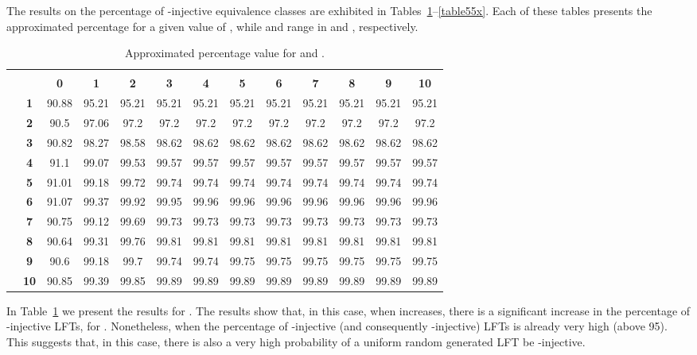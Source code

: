 \documentclass{ocg}
\newcommand{\LFT}{LFT}
\begin{document}
The results on the percentage of -injective equivalence classes
are exhibited in Tables~\ref{table25x}--\ref{table55x}. Each of these
tables presents the approximated percentage for a given value of , while  and  range in  and
, respectively.

\begin{table}[h]
  \centering\scriptsize
  \begin{tabular}{|c|c|c|c|c|c|c|c|c|c|c|c|c|}\cline{3-13}
    \multicolumn{1}{c}{}&\multicolumn{1}{c}{} & \multicolumn{11}{|c|}{\footnotesize } \\
    \cline{3-13} 
    \multicolumn{2}{c|}{}&\bf 0&\bf1&\bf2&\bf3&\bf4&\bf5&\bf6&\bf7&\bf8&\bf9&\bf10\\\hline
    \multirow{10}{*}{\footnotesize }& \bf 1
    &90.88&95.21&95.21&95.21&95.21&95.21&95.21&95.21&95.21&95.21&95.21\\
    \cline{2-13}
    &\bf 2& 90.5&97.06&97.2&97.2&97.2&97.2&97.2&97.2&97.2&97.2& 97.2\\
    \cline{2-13}
    &\bf 3&90.82&98.27&98.58&98.62&98.62&98.62&98.62&98.62&98.62&98.62&98.62\\
    \cline{2-13}
    &\bf 4&91.1&99.07&99.53&99.57&99.57&99.57&99.57&99.57&99.57&99.57&99.57\\
    \cline{2-13}
    &\bf 5&91.01&99.18&99.72&99.74&99.74&99.74&99.74&99.74&99.74&99.74&99.74\\
    \cline{2-13}
    &\bf 6&91.07&99.37&99.92&99.95&99.96&99.96&99.96&99.96&99.96&99.96&99.96\\
    \cline{2-13}
    &\bf 7&90.75&99.12&99.69&99.73&99.73&99.73&99.73&99.73&99.73&99.73&99.73\\
    \cline{2-13}
    &\bf 8&90.64&99.31&99.76&99.81&99.81&99.81&99.81&99.81&99.81&99.81&99.81\\
    \cline{2-13}
    &\bf 9&90.6&99.18&99.7&99.74&99.74&99.75&99.75&99.75&99.75&99.75&99.75\\
    \cline{2-13}
    &\bf 10&90.85&99.39&99.85&99.89&99.89&99.89&99.89&99.89&99.89&99.89&99.89\\
    \hline
  \end{tabular}
  \caption{Approximated percentage value for  and .}
  \label{table25x}
\end{table}

In Table~\ref{table25x} we present the results for . The results show
that, in this case, when  increases, there is a significant
increase in the percentage of -injective \LFT{}s, for . Nonetheless, when  the percentage of -injective (and
consequently -injective) \LFT{}s is already very high (above
95). This suggests that, in this case, there is also a very high
probability of a uniform random generated \LFT{} be
-injective.
\end{document}
